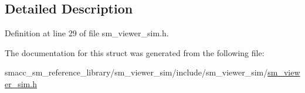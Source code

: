 \subsection{Detailed Description}


Definition at line 29 of file sm\+\_\+viewer\+\_\+sim.\+h.



The documentation for this struct was generated from the following file\+:\begin{DoxyCompactItemize}
\item 
smacc\+\_\+sm\+\_\+reference\+\_\+library/sm\+\_\+viewer\+\_\+sim/include/sm\+\_\+viewer\+\_\+sim/\hyperlink{sm__viewer__sim_8h}{sm\+\_\+viewer\+\_\+sim.\+h}\end{DoxyCompactItemize}
